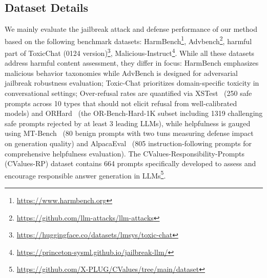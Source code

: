 \documentclass[11pt]{article}
\def\framework{ACE-Safety}
\begin{document}
\subsection{Dataset Details}  \label{app:dataset}
We mainly evaluate the jailbreak attack and defense performance of our method based on the following benchmark datasets: 
HarmBench\footnote{\footnotesize{\url{https://www.harmbench.org}}}, Advbench\footnote{\footnotesize{\url{https://github.com/llm-attacks/llm-attacks}}}, harmful part of
ToxicChat (0124 version)\footnote{\footnotesize{ \url{https://huggingface.co/datasets/lmsys/toxic-chat}}}, 
Malicious-Instruct\footnote{\footnotesize{ \url{https://princeton-sysml.github.io/jailbreak-llm/}}}. While all these datasets address harmful content assessment, they differ in focus: HarmBench emphasizes malicious behavior taxonomies while AdvBench is designed for adversarial jailbreak robustness evaluation; Toxic-Chat prioritizes domain-specific toxicity in conversational settings; Over-refusal rates are quantified via XSTest~\citep{rottger2024xstest} (250 safe prompts across 10 types that should not elicit refusal from well-calibrated models) and ORHard~\citep{orbench} (the OR-Bench-Hard-1K subset including 1319 challenging safe prompts rejected by at least 3 leading LLMs), while helpfulness is gauged using MT-Bench~\citep{mt-bench} (80 benign prompts with two tuns measuring defense impact on generation quality) and AlpacaEval~\citep{alpacaeval} (805 instruction-following prompts for comprehensive helpfulness evaluation). The CValues-Responsibility-Prompts (CValues-RP) dataset contains 664 prompts specifically developed to assess and encourage responsible answer generation in LLMs\footnote{\footnotesize{ \url{https://github.com/X-PLUG/CValues/tree/main/dataset}}}.


 
\end{document}
